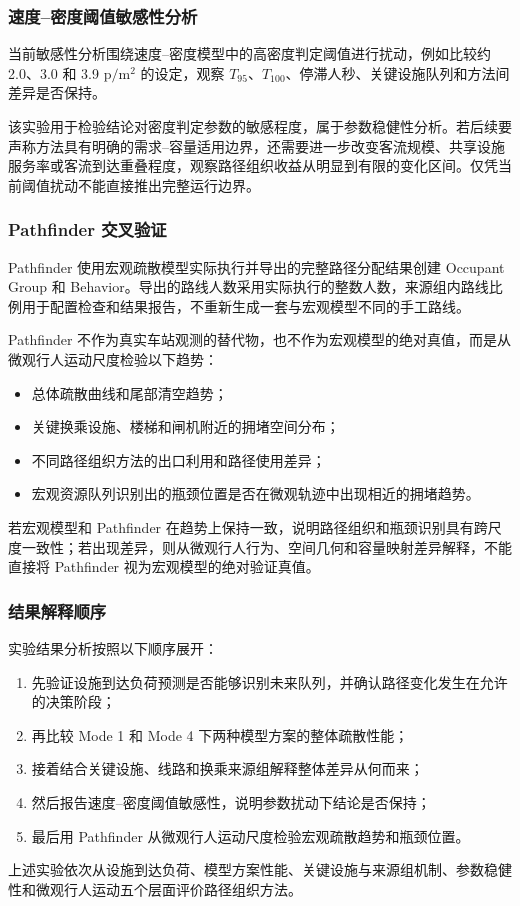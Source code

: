 \documentclass[UTF8,a4paper,12pt]{ctexart}
\begin{document}
\subsubsection{速度--密度阈值敏感性分析}

当前敏感性分析围绕速度--密度模型中的高密度判定阈值进行扰动，例如比较约 2.0、3.0 和 3.9 \(\mathrm{p/m^2}\) 的设定，观察 \(T_{95}\)、\(T_{100}\)、停滞人秒、关键设施队列和方法间差异是否保持。

该实验用于检验结论对密度判定参数的敏感程度，属于参数稳健性分析。若后续要声称方法具有明确的需求--容量适用边界，还需要进一步改变客流规模、共享设施服务率或客流到达重叠程度，观察路径组织收益从明显到有限的变化区间。仅凭当前阈值扰动不能直接推出完整运行边界。

\subsubsection{Pathfinder 交叉验证}

Pathfinder 使用宏观疏散模型实际执行并导出的完整路径分配结果创建 Occupant Group 和 Behavior。导出的路线人数采用实际执行的整数人数，来源组内路线比例用于配置检查和结果报告，不重新生成一套与宏观模型不同的手工路线。

Pathfinder 不作为真实车站观测的替代物，也不作为宏观模型的绝对真值，而是从微观行人运动尺度检验以下趋势：
\begin{itemize}
    \item 总体疏散曲线和尾部清空趋势；
    \item 关键换乘设施、楼梯和闸机附近的拥堵空间分布；
    \item 不同路径组织方法的出口利用和路径使用差异；
    \item 宏观资源队列识别出的瓶颈位置是否在微观轨迹中出现相近的拥堵趋势。
\end{itemize}

若宏观模型和 Pathfinder 在趋势上保持一致，说明路径组织和瓶颈识别具有跨尺度一致性；若出现差异，则从微观行人行为、空间几何和容量映射差异解释，不能直接将 Pathfinder 视为宏观模型的绝对验证真值。

\subsubsection{结果解释顺序}

实验结果分析按照以下顺序展开：
\begin{enumerate}
    \item 先验证设施到达负荷预测是否能够识别未来队列，并确认路径变化发生在允许的决策阶段；
    \item 再比较 Mode 1 和 Mode 4 下两种模型方案的整体疏散性能；
    \item 接着结合关键设施、线路和换乘来源组解释整体差异从何而来；
    \item 然后报告速度--密度阈值敏感性，说明参数扰动下结论是否保持；
    \item 最后用 Pathfinder 从微观行人运动尺度检验宏观疏散趋势和瓶颈位置。
\end{enumerate}

上述实验依次从设施到达负荷、模型方案性能、关键设施与来源组机制、参数稳健性和微观行人运动五个层面评价路径组织方法。
\end{document}
